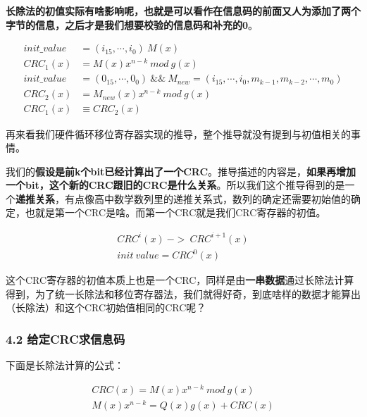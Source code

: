 \documentclass[
]{article}
\begin{document}
\textbf{长除法的初值实际有啥影响呢，也就是可以看作在信息码的前面又人为添加了两个字节的信息，之后才是我们想要校验的信息码和补充的0}。

\begin{equation}
\begin{aligned}
init\_value &= (i_{15},\cdots,i_0) \:M(x)\\
CRC_1(x)&=M(x)x^{n-k} \: mod \: g(x)\\
init\_value &= (0_{15},\cdots,0_0) \: \&\& \: M_{new} = (i_{15},\cdots,i_0,m_{k-1},m_{k-2},\cdots,m_0)\\
CRC_2(x)&=M_{new}(x)x^{n-k} \: mod \: g(x)\\
CRC_1(x) &\equiv CRC_2(x)
\end{aligned}
\end{equation}

再来看我们硬件循环移位寄存器实现的推导，整个推导就没有提到与初值相关的事情。

我们的\textbf{假设是前k个bit已经计算出了一个CRC}。推导描述的内容是，\textbf{如果再增加一个bit，这个新的CRC跟旧的CRC是什么关系}。所以我们这个推导得到的是一个\textbf{递推关系}，有点像高中数学数列里的递推关系式，数列的确定还需要初始值的确定，也就是第一个CRC是啥。而第一个CRC就是我们CRC寄存器的初值。

\begin{equation}
\begin{aligned}
CRC^i(x) \: -> \: CRC^{i+1}(x)\\
init \: value =CRC^0(x)
\end{aligned}
\end{equation}

这个CRC寄存器的初值本质上也是一个CRC，同样是由\textbf{一串数据}通过长除法计算得到，为了统一长除法和移位寄存器法，我们就得好奇，到底啥样的数据才能算出（长除法）和这个CRC初始值相同的CRC呢？

\hypertarget{header-n200}{%
\subsubsection{4.2 给定CRC求信息码}\label{header-n200}}

下面是长除法计算的公式：

\begin{equation}
\begin{aligned}
CRC(x)=M(x)x^{n-k} \: mod \: g(x)\\
M(x)x^{n-k}=Q(x)g(x)+CRC(x)\\
\end{aligned}
\end{equation}
\end{document}
